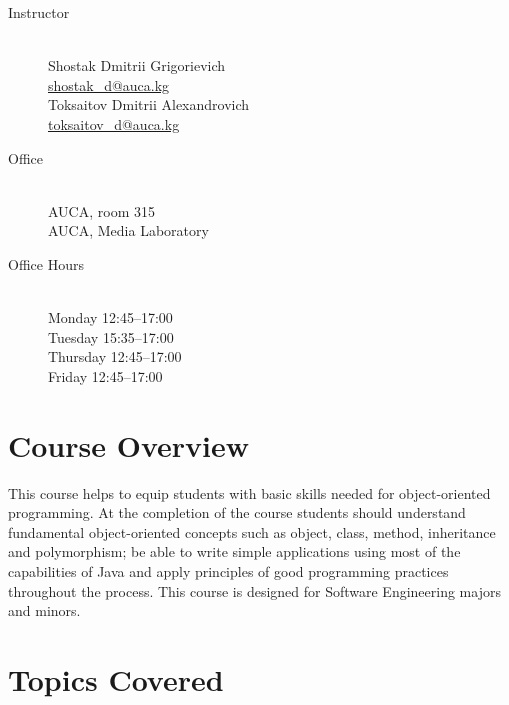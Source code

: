 \documentclass[12pt,a4paper,oneside]{article}
\begin{document}
        \begin{description}
            \item[Instructor]\hfill\\
                Shostak Dmitrii Grigorievich\\
                \href{mailto:shostak_d@auca.kg}{shostak\_d@auca.kg}\\
                Toksaitov Dmitrii Alexandrovich\\
                \href{mailto:toksaitov_d@auca.kg}{toksaitov\_d@auca.kg}
            \item[Office]\hfill\\
                AUCA, room 315\\
                AUCA, Media Laboratory
            \item[Office Hours]\hfill\\
                Monday 12:45--17:00\\
                Tuesday 15:35--17:00\\
                Thursday 12:45--17:00\\
                Friday 12:45--17:00
        \end{description}

    \section{Course Overview}

        This course helps to equip students with basic skills needed for
        object-oriented programming. At the completion of the course students
        should understand fundamental object-oriented concepts such as object,
        class, method, inheritance and polymorphism; be able to write simple
        applications using most of the capabilities of Java and apply principles
        of good programming practices throughout the process. This course is
        designed for Software Engineering majors and minors.

    \section{Topics Covered}
\end{document}
